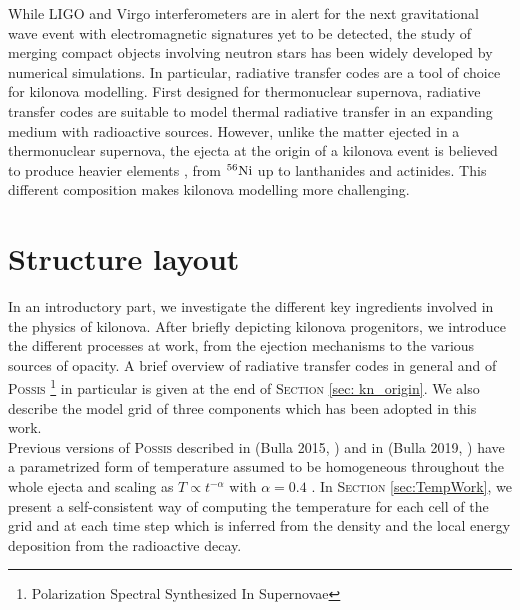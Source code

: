\documentclass[a4paper, twoside, 11pt]{article}
\numberwithin{equation}{section}
\begin{document}
While LIGO and Virgo interferometers are in alert for the next gravitational wave event with electromagnetic signatures yet to be detected, the study of merging compact objects involving neutron stars has been widely developed by numerical simulations. In particular, radiative transfer codes are a tool of choice for kilonova modelling. First designed for thermonuclear supernova, radiative transfer codes are suitable to model thermal radiative transfer in an expanding medium with radioactive sources. However, unlike the matter ejected in a thermonuclear supernova, the ejecta at the origin of a kilonova event is believed to produce heavier elements , from $^{56}\rm{Ni}$ up to lanthanides and actinides.
This different composition makes kilonova modelling more challenging. 

\newpage
\section*{Structure layout}
\hspace{\parindent}		In an introductory part, we investigate the different key ingredients involved in the physics of kilonova. After briefly depicting kilonova progenitors, we introduce the different processes at work, from the ejection mechanisms to the various sources of opacity. A brief overview of radiative transfer codes in general and of P\textsc{ossis} \footnote{Polarization Spectral Synthesized In Supernovae} in particular is given at the end of  S\textsc{ection} \ref{sec: kn_origin}.  We also describe the model grid of three components which has been adopted in this work.\\

Previous versions of P\textsc{ossis} described in (Bulla 2015, \cite{POSSIS_2015}) and in (Bulla 2019, \cite{POSSIS_2019}) have a parametrized form of temperature assumed to be homogeneous throughout the whole ejecta and scaling as $T \propto t^{-\alpha}$ with $\alpha = 0.4 $ \cite{MHD}. In  S\textsc{ection} \ref{sec:TempWork}, we present a self-consistent way of computing the temperature for each cell of the grid and at each time step which is inferred from the density and the local energy deposition from the radioactive decay. \\
\end{document}
